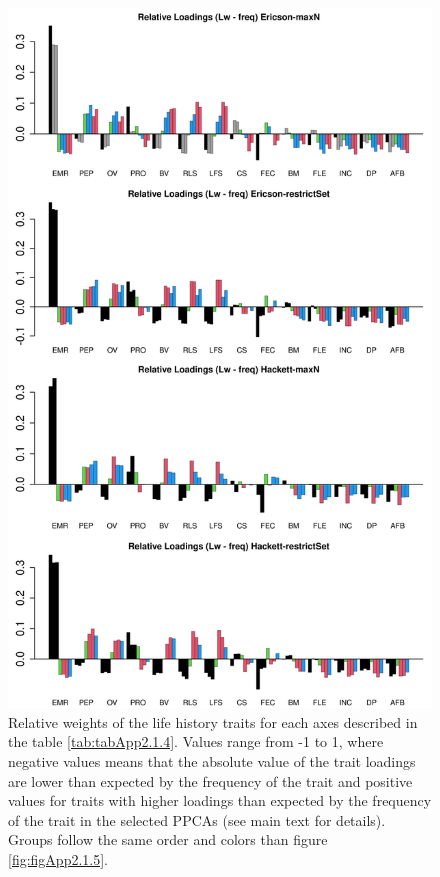 \begin{figure}[ht!]
\centering
\includegraphics[width=.8\textwidth]{./Figures/Appendix2_1/2nd relWeights plots-ALL.png}
\caption[LHT relative importance of the secondary axes]{
Relative weights of the life history traits for each axes described in the
table \ref{tab:tabApp2.1.4}. Values range from -1 to 1, where negative values
means that the absolute value of the trait loadings are lower than expected by
the frequency of the trait and positive values for traits with higher loadings
than expected by the frequency of the trait in the selected PPCAs (see main
text for details). Groups follow the same order and colors than figure
\ref{fig:figApp2.1.5}.}
\label{fig:figApp2.1.4}
\end{figure}

